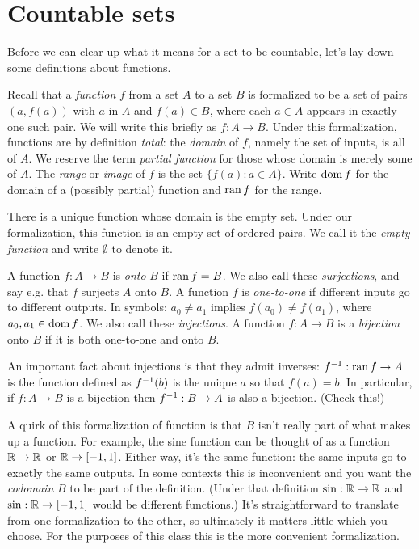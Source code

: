 \documentclass[10pt]{amsart}
\begin{document}
\newpage

\section{Countable sets}

Before we can clear up what it means for a set to be countable, let's lay down some definitions about functions.

Recall that a \emph{function} $f$ from a set $A$ to a set $B$ is formalized to be a set of pairs $(a,f(a))$ with $a$ in $A$ and $f(a) \in B$, where each $a \in A$ appears in exactly one such pair. We will write this briefly as $f : A \to B$. Under this formalization, functions are by definition \emph{total}: the \emph{domain} of $f$, namely the set of inputs, is all of $A$. We reserve the term \emph{partial function} for those whose domain is merely some of $A$. The \emph{range} or \emph{image} of $f$ is the set $\{f(a) : a \in A \}$.
Write $\operatorname{dom} f$ for the domain of a (possibly partial) function and $\operatorname{ran} f$ for the range.

\begin{example}
There is a unique function whose domain is the empty set. Under our formalization, this function is an empty set of ordered pairs. We call it the \emph{empty function} and write $\emptyset$ to denote it.
\end{example}

A function $f : A \to B$ is \emph{onto} $B$ if $\operatorname{ran} f = B$. We also call these \emph{surjections}, and say e.g. that $f$ surjects $A$ onto $B$. A function $f$ is \emph{one-to-one} if different inputs go to different outputs. In symbols: $a_0 \ne a_1$ implies $f(a_0) \ne f(a_1)$, where $a_0,a_1 \in \operatorname{dom} f$. We also call these \emph{injections}. A function $f : A \to B$ is a \emph{bijection} onto $B$ if it is both one-to-one and onto $B$.

An important fact about injections is that they admit inverses: $f^{-1} : \operatorname{ran} f \to A$ is the function defined as $f^{-1}(b)$ is the unique $a$ so that $f(a) = b$. In particular, if $f : A \to B$ is a bijection then $f^{-1} : B \to A$ is also a bijection. (Check this!)

A quirk of this formalization of function is that $B$ isn't really part of what makes up a function. For example, the sine function can be thought of as a function $\mathbb{R} \to \mathbb{R}$ or $\mathbb{R} \to [-1,1]$. Either way, it's the same function: the same inputs go to exactly the same outputs. In some contexts this is inconvenient and you want the \emph{codomain} $B$ to be part of the definition. (Under that definition $\sin : \mathbb{R} \to \mathbb{R}$ and $\sin : \mathbb{R} \to [-1,1]$ would be different functions.) It's straightforward to translate from one formalization to the other, so ultimately it matters little which you choose. For the purposes of this class this is the more convenient formalization.
\end{document}
